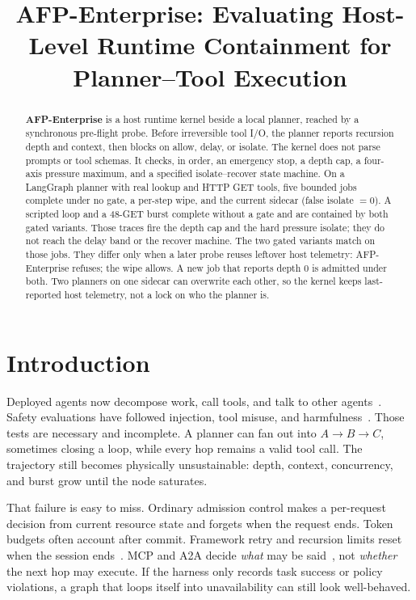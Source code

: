 \documentclass[11pt,a4paper]{article}
\title[AFP-Enterprise]{AFP-Enterprise: Evaluating Host-Level Runtime Containment for Planner--Tool Execution}
\begin{document}
\maketitle

\begin{abstract}
\textbf{AFP-Enterprise} is a host runtime kernel beside a local planner, reached by a synchronous pre-flight probe.
Before irreversible tool I/O, the planner reports recursion depth and context, then blocks on allow, delay, or isolate.
The kernel does not parse prompts or tool schemas.
It checks, in order, an emergency stop, a depth cap, a four-axis pressure maximum, and a specified isolate--recover state machine.
On a LangGraph planner with real lookup and HTTP GET tools, five bounded jobs complete under no gate, a per-step wipe, and the current sidecar (false isolate $=0$).
A scripted loop and a 48-GET burst complete without a gate and are contained by both gated variants.
Those traces fire the depth cap and the hard pressure isolate; they do not reach the delay band or the recover machine.
The two gated variants match on those jobs.
They differ only when a later probe reuses leftover host telemetry: AFP-Enterprise refuses; the wipe allows.
A new job that reports depth $0$ is admitted under both.
Two planners on one sidecar can overwrite each other, so the kernel keeps last-reported host telemetry, not a lock on who the planner is.
\end{abstract}

\section{Introduction}
\label{sec:introduction}

Deployed agents now decompose work, call tools, and talk to other agents~\citep{yao2023react,wu2023autogen,langchain2025langgraph,anthropic2024mcp,google2025a2a}.
Safety evaluations have followed injection, tool misuse, and harmfulness~\citep{greshake2023not,debenedetti2024agentdojo,andriushchenko2024agentharm,hou2025mcp}.
Those tests are necessary and incomplete.
A planner can fan out into $A\!\rightarrow\!B\!\rightarrow\!C$, sometimes closing a loop, while every hop remains a valid tool call.
The trajectory still becomes physically unsustainable: depth, context, concurrency, and burst grow until the node saturates.

That failure is easy to miss.
Ordinary admission control makes a per-request decision from current resource state and forgets when the request ends.
Token budgets often account after commit.
Framework retry and recursion limits reset when the session ends~\citep{cemri2025why}.
MCP and A2A decide \emph{what} may be said~\citep{anthropic2024mcp,google2025a2a}, not \emph{whether} the next hop may execute.
If the harness only records task success or policy violations, a graph that loops itself into unavailability can still look well-behaved.
\end{document}
